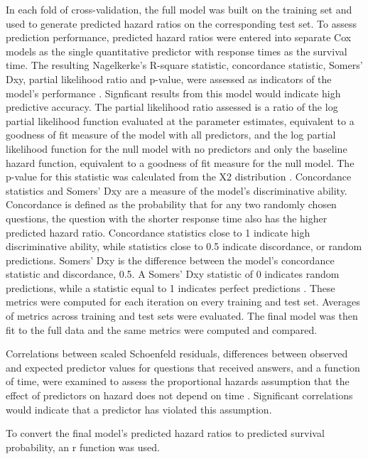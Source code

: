 \documentclass{article}
\begin{document}
In each fold of cross-validation, the full model was built on the training set and used to generate predicted hazard ratios on the corresponding test set. To assess prediction performance, predicted hazard ratios were entered into separate Cox models as the single quantitative predictor with response times as the survival time. The resulting Nagelkerke's R-square statistic, concordance statistic, Somers' Dxy, partial likelihood ratio and p-value, were assessed as indicators of the model's performance \cite{Chen}. Signficant results from this model would indicate high predictive accuracy. The partial likelihood ratio assessed is a ratio of the log partial likelihood function evaluated at the parameter estimates, equivalent to a goodness of fit measure of the model with all predictors, and the log partial likelihood function for the null model with no predictors and only the baseline hazard function, equivalent to a goodness of fit measure for the null model. The p-value for this statistic was calculated from the X2 distribution \cite{find}. Concordance statistics and Somers' Dxy are a measure of the model's discriminative ability. Concordance is defined as the probability that for any two randomly chosen questions, the question with the shorter response time also has the higher predicted hazard ratio. Concordance statistics close to 1 indicate high discriminative ability, while statistics close to 0.5 indicate discordance, or random predictions. Somers' Dxy is the difference between the model's concordance statistic and discordance, 0.5. A Somers' Dxy statistic of 0 indicates random predictions, while a statistic equal to 1 indicates perfect predictions \cite{Harrell2015}. These metrics were computed for each iteration on every training and test set. Averages of metrics across training and test sets were evaluated. The final model was then fit to the full data and the same metrics were computed and compared. 

Correlations between scaled Schoenfeld residuals, differences between observed and expected predictor values for questions that received answers, and a function of time, were examined to assess the proportional hazards assumption that the effect of predictors on hazard does not depend on time \cite{Grambsch1994}. Significant correlations would indicate that a predictor has violated this assumption.

To convert the final model's predicted hazard ratios to predicted survival probability, an r function was used. 

\end{document}
